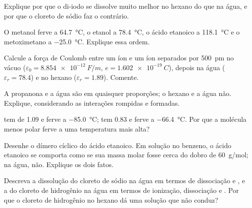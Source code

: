 \begin{exercise}[$\star$]\label{exo:b1:intermolecular-forces-solvents:4}
Explique por que o di-iodo se dissolve muito melhor no hexano do que na
água, e por que o cloreto de sódio faz o contrário.
\end{exercise}

\begin{exercise}[$\star\star$]\label{exo:b1:intermolecular-forces-solvents:5}
O metanol ferve a \qty{64.7}{\celsius}, o etanol a \qty{78.4}{\celsius},
o ácido etanoico a \qty{118.1}{\celsius} e o metoximetano a
\qty{-25.0}{\celsius}. Explique essa ordem.
\end{exercise}

\begin{exercise}[$\star\star$]\label{exo:b1:intermolecular-forces-solvents:6}
Calcule a força de Coulomb entre um íon  e um íon 
separados por \qty{500}{pm} no vácuo ($\varepsilon_0 = \qty{8.854e-12}{F/m}$,
$e = \qty{1.602e-19}{C}$), depois na água ($\varepsilon_r = 78.4$) e no
hexano ($\varepsilon_r = 1.89$). Comente.
\end{exercise}

\begin{exercise}[$\star\star$]\label{exo:b1:intermolecular-forces-solvents:7}
A propanona e a água são  em quaisquer proporções; o hexano e a
água não. Explique, considerando as interações rompidas e formadas.
\end{exercise}

\begin{exercise}[$\star\star$]\label{exo:b1:intermolecular-forces-solvents:8}
 tem  de \qty{1.09}{\debye} e ferve a
\qty{-85.0}{\celsius};  tem \qty{0.83}{\debye} e ferve a
\qty{-66.4}{\celsius}. Por que a molécula menos polar ferve a uma
temperatura mais alta?
\end{exercise}

\begin{exercise}[$\star\star$]\label{exo:b1:intermolecular-forces-solvents:9}
Desenhe o dímero cíclico do ácido etanoico. Em solução no benzeno, o
ácido etanoico se comporta como se sua massa molar fosse cerca do dobro
de \qty{60}{g/mol}; na água, não. Explique os dois fatos.
\end{exercise}

\begin{exercise}[$\star\star\star$]\label{exo:b1:intermolecular-forces-solvents:10}
Descreva a dissolução do cloreto de sódio na água em termos de
dissociação e , e a do cloreto de hidrogênio na água em termos
de ionização, dissociação e . Por que o cloreto de hidrogênio
no hexano dá uma solução que não conduz?
\end{exercise}

